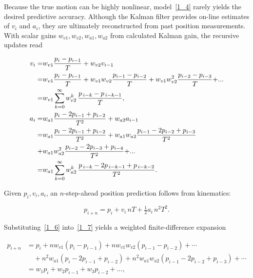 \documentclass[sn-nature]{sn-jnl}%
\theoremstyle{thmstyleone}%
\theoremstyle{thmstyletwo}%
\theoremstyle{thmstylethree}%
\begin{document}
\noindent

\medskip
Because the true motion can be highly nonlinear, model~\eqref{1_4} rarely yields the desired predictive accuracy.  Although the Kalman filter provides on-line estimates of \(v_i\) and \(a_i\), they are ultimately reconstructed from past position measurements.  With scalar gains \(w_{v1},w_{v2},w_{a1},w_{a2}\) from calculated Kalman gain, the recursive updates read

\begin{equation}
\label{1_6}
\begin{aligned}
{v_i} =& {w_{v1}}\frac{{{p_i} - {p_{i - 1}}}}{T} + {w_{v2}}{v_{i - 1}}\\
    =& {w_{v1}}\frac{{{p_i} - {p_{i - 1}}}}{T} + {w_{v1}}{w_{v2}}\frac{{{p_{i - 1}} - {p_{i - 2}}}}{T} + {w_{v1}}w_{v2}^{\rm{2}}\frac{{{p_{i - {\rm{2}}}} - {p_{i - {\rm{3}}}}}}{T}{\rm{ + }}...\\
    =& w_{v1}\sum_{k=0}^{\infty} w_{v2}^{k}\,
       \frac{p_{\,i-k}-p_{\,i-k-1}}{T},\\
{a_i} =& {w_{a1}}\frac{{{p_i} - 2{p_{i - 1}} + {p_{i - 2}}}}{{{T^2}}} + {w_{a2}}{a_{i - 1}}\\
    =& {w_{a1}}\frac{{{p_i} - 2{p_{i - 1}} + {p_{i - 2}}}}{{{T^2}}}+ {w_{a1}}{w_{a2}}\frac{{{p_{i - 1}} - 2{p_{i - 2}} + {p_{i - 3}}}}{{{T^2}}} \\
    +& {w_{a1}}w_{a2}^{\rm{2}}\frac{{{p_{i - 2}} - 2{p_{i - 3}} + {p_{i - 4}}}}{{{T^2}}}{\rm{ + }}...\\
    =& w_{a1}\sum_{k=0}^{\infty} w_{a2}^{k}\,
        \frac{p_{\,i-k}-2p_{\,i-k-1}+p_{\,i-k-2}}{T^{2}} .
\end{aligned}
\end{equation}

\noindent
Given \(p_i,v_i,a_i\), an \(n\)-step-ahead position prediction follows from kinematics:

\begin{equation}
\label{1_7}
p_{i+n}=p_i+v_i\,nT+\tfrac12 a_i\,n^{2}T^{2}.
\end{equation}

\noindent
Substituting~\eqref{1_6} into~\eqref{1_7} yields a weighted finite-difference expansion

\begin{equation}
\label{1_8}
\begin{aligned}
p_{i+n} &=
p_i+n w_{v1}(p_i-p_{i-1})+n w_{v1}w_{v2}(p_{i-1}-p_{i-2})+\cdots\\
&\quad +n^{2}w_{a1}(p_i-2p_{i-1}+p_{i-2})
       +n^{2}w_{a1}w_{a2}(p_{i-1}-2p_{i-2}+p_{i-3})+\cdots\\
&= w_1 p_i+w_2 p_{i-1}+w_3 p_{i-2}+\ldots,
\end{aligned}
\end{equation}
\end{document}
